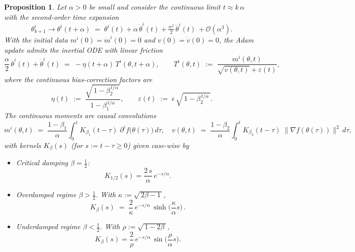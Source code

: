 \documentclass[10pt,a4paper]{amsart}
\newtheorem{proposition}{Proposition}
\begin{document}
\begin{proposition}\label{prop:Adam2}
Let $\alpha>0$ be small and consider the continuous limit $t\approx k\,\alpha$ with the second-order time expansion
\[
\theta^i_{k+1} \to \theta^i(t+\alpha)\;=\;\theta^i(t)+\alpha\,\dot\theta^i(t)+\tfrac{\alpha^2}{2}\,\ddot\theta^i(t)\,+\mathcal{O}(\alpha^3).
\]
With the initial data $m^i(0)=\dot m^i(0)=0$ and $v(0)=\dot v(0)=0$, the Adam update admits the inertial ODE with linear friction
\begin{equation}\label{eq:inertial}
\frac{\alpha}{2}\,\ddot\theta^i(t)+\dot\theta^i(t)\;=\;-\eta(t+\alpha)\,T^i(\theta,t+\alpha),
\qquad
T^i(\theta,t)\;:=\;\frac{m^i(\theta,t)}{\sqrt{v(\theta,t)}+\varepsilon(t)}, 
\end{equation}
where the continuous bias-correction factors are
\[
\eta(t)\;:=\;\frac{\sqrt{\,1-\beta_2^{\,t/\alpha}\,}}{\,1-\beta_1^{\,t/\alpha}\,},\qquad
\varepsilon(t)\;:=\;\epsilon\,\sqrt{\,1-\beta_2^{\,t/\alpha}\,}.
\]
The continuous moments are causal convolutions
\[
m^i(\theta,t)\;=\;\frac{1-\beta_1}{\alpha}\int_{0}^{t} K_{\beta_1}(t-\tau)\;\partial^i f\!\big(\theta(\tau)\big)\,d\tau,\quad
v(\theta,t)\;=\;\frac{1-\beta_2}{\alpha}\int_{0}^{t} K_{\beta_2}(t-\tau)\;\|\nabla f(\theta(\tau))\|^2\,d\tau,
\]
with kernels $K_\beta(s)$ (for $s:=t-\tau\ge 0$) given case-wise by
\begin{itemize}
\item[\textbullet] Critical damping $\beta=\tfrac12$:
\[
K_{1/2}(s)=\frac{2\,s}{\alpha}\,e^{-s/\alpha}.
\]
\item[\textbullet] Overdamped regime $\beta>\tfrac12$. With $\kappa:=\sqrt{\,2\beta-1\,}$,
\[
K_\beta(s)\;=\; \frac{2}{\kappa}\,e^{-s/\alpha}\,\sinh\!\Big(\frac{\kappa}{\alpha}s\Big)\,.
\]
\item[\textbullet] Underdamped regime $\beta<\tfrac12$. With $\rho:=\sqrt{\,1-2\beta\,}$,
\[
K_\beta(s)=\frac{2}{\rho}\,e^{-s/\alpha}\,\sin\!\Big(\frac{\rho}{\alpha}s\Big).
\]
\end{itemize}
\end{proposition}
\end{document}
